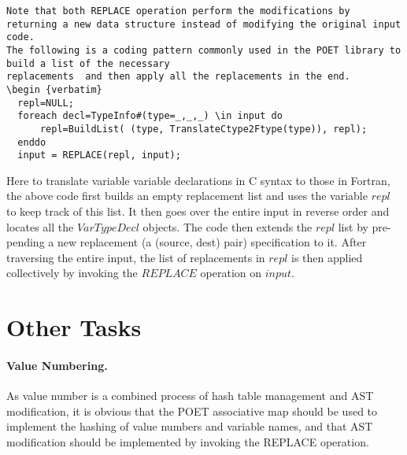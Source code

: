 \documentclass[11pt]{article}
\begin{document}
\begin {verbatim}
Note that both REPLACE operation perform the modifications by returning a new data structure instead of modifying the original input code. 
The following is a coding pattern commonly used in the POET library to build a list of the necessary 
replacements  and then apply all the replacements in the end. 
\begin {verbatim}
  repl=NULL;
  foreach decl=TypeInfo#(type=_,_,_) \in input do 
      repl=BuildList( (type, TranslateCtype2Ftype(type)), repl); 
  enddo
  input = REPLACE(repl, input);
\end {verbatim}
Here to translate variable variable declarations in C syntax to those in Fortran, the above code
first builds an empty replacement list and uses the variable $repl$ to keep track of this list.
It then goes over the entire input in reverse order and locates all the $VarTypeDecl$ objects. 
The code then extends the $repl$ list by pre-pending a new replacement (a (source, dest) pair)
specification to it. After traversing the entire input, the list of replacements in $repl$ is then applied
collectively by invoking the $REPLACE$ operation on $input$.

\section {Other Tasks}
\paragraph {Value Numbering.} As value number is a combined process of hash table management
and AST modification, it is obvious that the POET associative map should be used to implement
the hashing of value numbers and variable names, and that AST modification should be implemented
by invoking the REPLACE operation. 
 
 
\end{document}
